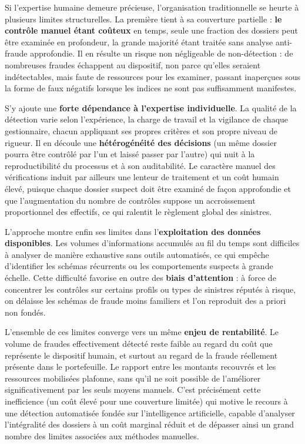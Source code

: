Si l'expertise humaine demeure précieuse, l'organisation traditionnelle se heurte à plusieurs limites structurelles. La première tient à sa couverture partielle : \textbf{le contrôle manuel étant coûteux} en temps, seule une fraction des dossiers peut être examinée en profondeur, la grande majorité étant traitée sans analyse anti-fraude approfondie. Il en résulte un risque non négligeable de non-détection : de nombreuses fraudes échappent au dispositif, non parce qu'elles seraient indétectables, mais faute de ressources pour les examiner, passant inaperçues sous la forme de faux négatifs lorsque les indices ne sont pas suffisamment manifestes.

S'y ajoute une \textbf{forte dépendance à l'expertise individuelle}. La qualité de la détection varie selon l'expérience, la charge de travail et la vigilance de chaque gestionnaire, chacun appliquant ses propres critères et son propre niveau de rigueur. Il en découle une \textbf{hétérogénéité des décisions} (un même dossier pourra être contrôlé par l'un et laissé passer par l'autre) qui nuit à la reproductibilité du processus et à son auditabilité. Le caractère manuel des vérifications induit par ailleurs une lenteur de traitement et un coût humain élevé, puisque chaque dossier suspect doit être examiné de façon approfondie et que l'augmentation du nombre de contrôles suppose un accroissement proportionnel des effectifs, ce qui ralentit le règlement global des sinistres.

L'approche montre enfin ses limites dans l'\textbf{exploitation des données disponibles}. Les volumes d'informations accumulés au fil du temps sont difficiles à analyser de manière exhaustive sans outils automatisés, ce qui empêche d'identifier les schémas récurrents ou les comportements suspects à grande échelle. Cette difficulté favorise en outre des \textbf{biais d'attention} : à force de concentrer les contrôles sur certains profils ou types de sinistres réputés à risque, on délaisse les schémas de fraude moins familiers et l'on reproduit des a priori non fondés.

L'ensemble de ces limites converge vers un même \textbf{enjeu de rentabilité}. Le volume de fraudes effectivement détecté reste faible au regard du coût que représente le dispositif humain, et surtout au regard de la fraude réellement présente dans le portefeuille. Le rapport entre les montants recouvrés et les ressources mobilisées plafonne, sans qu'il ne soit possible de l'améliorer significativement par les seuls moyens manuels. C'est précisément cette inefficience (un coût élevé pour une couverture limitée) qui motive le recours à une détection automatisée fondée sur l'intelligence artificielle, capable d'analyser l'intégralité des dossiers à un coût marginal réduit et de dépasser ainsi un grand nombre des limites associées aux méthodes manuelles.

